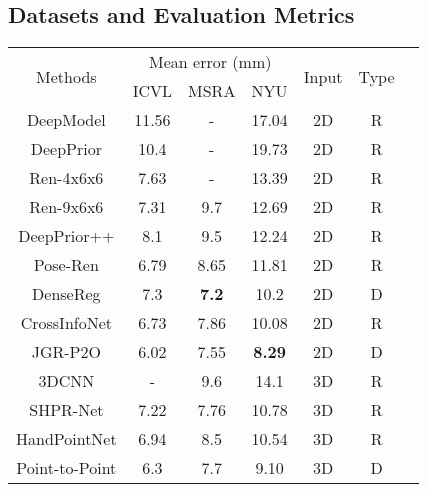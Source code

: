 \documentclass[10pt,twocolumn,letterpaper]{article}
\begin{document}
\subsection{Datasets and Evaluation Metrics}

\begin{table}[h!]
\setlength\tabcolsep{5pt}\small
\begin{center}

\begin{tabular}{ccccccc}
\hline
\multirow{2}{*}{Methods} & \multicolumn{3}{c}{Mean error (mm)}& \multirow{2}{*}{Input}& \multirow{2}{*}{Type} \\
\cline{2-4}
                        & ICVL          &   MSRA        &   NYU     &   \\
\hline

DeepModel \cite{zhou2016model}       &11.56          & -            & 17.04             &2D   &R  \\
DeepPrior \cite{oberweger2015hands}  &10.4           & -            & 19.73             &2D   &R  \\
Ren-4x6x6 \cite{guo2017region}       &7.63           & -            & 13.39            &2D   &R  \\
Ren-9x6x6 \cite{wan2018dense}        &7.31           & 9.7          & 12.69           &2D   &R  \\
DeepPrior++ \cite{oberweger2017deepprior++}          &8.1           & 9.5           & 12.24           &2D   &R  \\
Pose-Ren \cite{chen2020pose}         &6.79           & 8.65         & 11.81         &2D   &R  \\
DenseReg \cite{wan2018dense}         &7.3            & \textbf{7.2} & 10.2 &2D   &D  \\
CrossInfoNet \cite{du2019crossinfonet}&6.73          & 7.86         & 10.08          &2D   &R  \\
JGR-P2O \cite{fang2020jgr}           &6.02           & 7.55         & \textbf{8.29}          &2D   &D  \\
\hline
3DCNN \cite{ge20173d}                & -             &9.6           & 14.1            &3D   &R  \\
SHPR-Net \cite{chen2018shpr}         &7.22           & 7.76         & 10.78          &3D   &R  \\
HandPointNet \cite{ge2018hand}       &6.94           & 8.5          & 10.54           &3D   &R  \\
Point-to-Point \cite{ge2018point}    &6.3            &7.7           & 9.10            &3D   &D  \\

\end{tabular}
\end{center}
\end{table}
\end{document}
